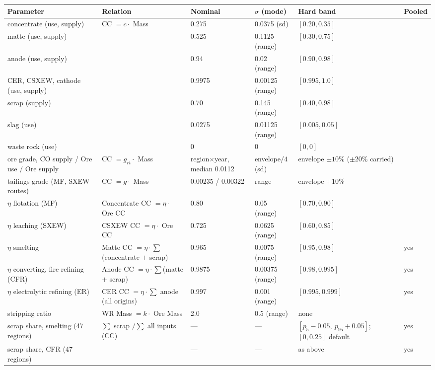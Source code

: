 \documentclass[11pt]{article}
\begin{document}
\begin{table}[h]
\centering\footnotesize
\begin{tabular}{@{}llllll@{}}
\toprule
Parameter & Relation & Nominal & $\sigma$ (mode) & Hard band & Pooled \\
\midrule
concentrate (use, supply) & CC $= c \cdot$ Mass & 0.275 & 0.0375 (sd) & $[0.20, 0.35]$ & \\
matte (use, supply) & & 0.525 & 0.1125 (range) & $[0.30, 0.75]$ & \\
anode (use, supply) & & 0.94 & 0.02 (range) & $[0.90, 0.98]$ & \\
CER, CSXEW, cathode (use, supply) & & 0.9975 & 0.00125 (range) & $[0.995, 1.0]$ & \\
scrap (supply) & & 0.70 & 0.145 (range) & $[0.40, 0.98]$ & \\
slag (use) & & 0.0275 & 0.01125 (range) & $[0.005, 0.05]$ & \\
waste rock (use) & & 0 & 0 & $[0, 0]$ & \\
ore grade, CO supply / Ore use / Ore supply & CC $= g_{rt} \cdot$ Mass & region$\times$year, median 0.0112 & envelope$/4$ (sd) & envelope $\pm10\%$ ($\pm20\%$ carried) & \\
tailings grade (MF, SXEW routes) & CC $= g \cdot$ Mass & 0.00235 / 0.00322 & range & envelope $\pm10\%$ & \\
$\eta$ flotation (MF) & Concentrate CC $= \eta \cdot$ Ore CC & 0.80 & 0.05 (range) & $[0.70, 0.90]$ & \\
$\eta$ leaching (SXEW) & CSXEW CC $= \eta \cdot$ Ore CC & 0.725 & 0.0625 (range) & $[0.60, 0.85]$ & \\
$\eta$ smelting & Matte CC $= \eta \cdot \sum$(concentrate $+$ scrap) & 0.965 & 0.0075 (range) & $[0.95, 0.98]$ & yes \\
$\eta$ converting, fire refining (CFR) & Anode CC $= \eta \cdot \sum$(matte $+$ scrap) & 0.9875 & 0.00375 (range) & $[0.98, 0.995]$ & yes \\
$\eta$ electrolytic refining (ER) & CER CC $= \eta \cdot \sum$ anode (all origins) & 0.997 & 0.001 (range) & $[0.995, 0.999]$ & yes \\
stripping ratio & WR Mass $= k \cdot$ Ore Mass & 2.0 & 0.5 (range) & none & \\
scrap share, smelting (47 regions) & $\sum$ scrap $/ \sum$ all inputs (CC) & --- & --- & $[p_5 - 0.05,\ p_{95} + 0.05]$; $[0, 0.25]$ default & yes \\
scrap share, CFR (47 regions) & & --- & --- & as above & yes \\

\end{tabular}
\end{table}
\end{document}
